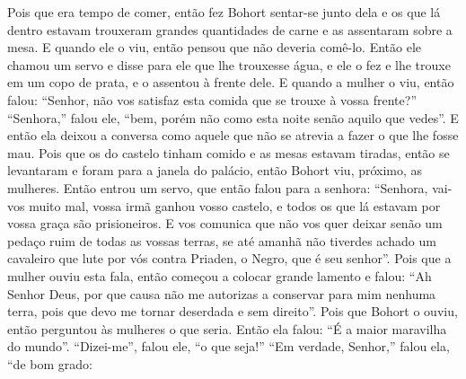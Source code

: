 Pois que era tempo de comer, então fez Bohort sentar-se junto dela e os que lá
dentro estavam trouxeram grandes quantidades de carne e as assentaram sobre a
mesa. E quando ele o viu, então pensou que não deveria comê-lo. Então ele
chamou um servo e disse para ele que lhe trouxesse água, e ele o fez e lhe
trouxe em um copo de prata, e o assentou à frente dele. E quando a mulher o
viu, então falou: “Senhor, não vos satisfaz esta comida que se trouxe à vossa
frente?” “Senhora,” falou ele, “bem, porém não como esta noite senão aquilo
que vedes”. E então ela deixou a conversa como aquele que não se atrevia a
fazer o que lhe fosse mau. Pois que os do castelo tinham comido e as mesas
estavam tiradas, então se levantaram e foram para a janela do palácio, então
Bohort viu, próximo, as mulheres. Então entrou um servo, que então falou para a
senhora: “Senhora, vai-vos muito mal, vossa irmã ganhou vosso castelo, e todos
os que lá estavam por vossa graça são prisioneiros. E vos comunica que não vos
quer deixar senão um pedaço ruim de todas as vossas terras, se até amanhã não tiverdes
achado um cavaleiro que lute por vós contra Priaden, o Negro, que é seu
senhor”. Pois que a mulher ouviu esta fala, então começou a colocar grande
lamento e falou: “Ah Senhor Deus, por que causa não me autorizas a conservar
para mim nenhuma terra, pois que devo me tornar deserdada e sem direito”. Pois
que Bohort o ouviu, então perguntou às mulheres o que seria. Então ela falou:
“É a maior maravilha do mundo”. “Dizei-me”, falou ele, “o que seja!” “Em
verdade, Senhor,” falou ela, “de bom grado:

